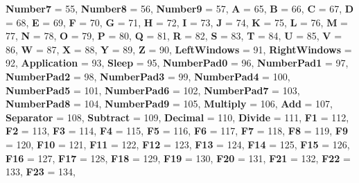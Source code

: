 \begin{DoxyCompactItemize}
{\bfseries Number7} = 55, 
{\bfseries Number8} = 56, 
{\bfseries Number9} = 57, 
{\bfseries A} = 65, 
\newline
{\bfseries B} = 66, 
{\bfseries C} = 67, 
{\bfseries D} = 68, 
{\bfseries E} = 69, 
\newline
{\bfseries F} = 70, 
{\bfseries G} = 71, 
{\bfseries H} = 72, 
{\bfseries I} = 73, 
\newline
{\bfseries J} = 74, 
{\bfseries K} = 75, 
{\bfseries L} = 76, 
{\bfseries M} = 77, 
\newline
{\bfseries N} = 78, 
{\bfseries O} = 79, 
{\bfseries P} = 80, 
{\bfseries Q} = 81, 
\newline
{\bfseries R} = 82, 
{\bfseries S} = 83, 
{\bfseries T} = 84, 
{\bfseries U} = 85, 
\newline
{\bfseries V} = 86, 
{\bfseries W} = 87, 
{\bfseries X} = 88, 
{\bfseries Y} = 89, 
\newline
{\bfseries Z} = 90, 
{\bfseries Left\+Windows} = 91, 
{\bfseries Right\+Windows} = 92, 
{\bfseries Application} = 93, 
\newline
{\bfseries Sleep} = 95, 
{\bfseries Number\+Pad0} = 96, 
{\bfseries Number\+Pad1} = 97, 
{\bfseries Number\+Pad2} = 98, 
\newline
{\bfseries Number\+Pad3} = 99, 
{\bfseries Number\+Pad4} = 100, 
{\bfseries Number\+Pad5} = 101, 
{\bfseries Number\+Pad6} = 102, 
\newline
{\bfseries Number\+Pad7} = 103, 
{\bfseries Number\+Pad8} = 104, 
{\bfseries Number\+Pad9} = 105, 
{\bfseries Multiply} = 106, 
\newline
{\bfseries Add} = 107, 
{\bfseries Separator} = 108, 
{\bfseries Subtract} = 109, 
{\bfseries Decimal} = 110, 
\newline
{\bfseries Divide} = 111, 
{\bfseries F1} = 112, 
{\bfseries F2} = 113, 
{\bfseries F3} = 114, 
\newline
{\bfseries F4} = 115, 
{\bfseries F5} = 116, 
{\bfseries F6} = 117, 
{\bfseries F7} = 118, 
\newline
{\bfseries F8} = 119, 
{\bfseries F9} = 120, 
{\bfseries F10} = 121, 
{\bfseries F11} = 122, 
\newline
{\bfseries F12} = 123, 
{\bfseries F13} = 124, 
{\bfseries F14} = 125, 
{\bfseries F15} = 126, 
\newline
{\bfseries F16} = 127, 
{\bfseries F17} = 128, 
{\bfseries F18} = 129, 
{\bfseries F19} = 130, 
\newline
{\bfseries F20} = 131, 
{\bfseries F21} = 132, 
{\bfseries F22} = 133, 
{\bfseries F23} = 134, 

\end{DoxyCompactItemize}

